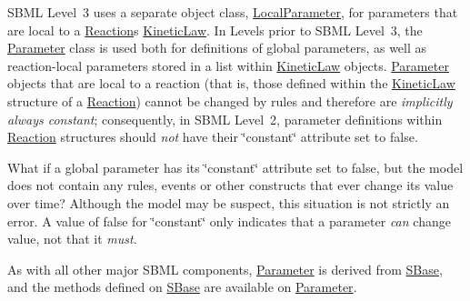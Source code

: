 S\+B\+ML Level~3 uses a separate object class, \hyperlink{class_local_parameter}{Local\+Parameter}, for parameters that are local to a \hyperlink{class_reaction}{Reaction}\textquotesingle{}s \hyperlink{class_kinetic_law}{Kinetic\+Law}. In Levels prior to S\+B\+ML Level~3, the \hyperlink{class_parameter}{Parameter} class is used both for definitions of global parameters, as well as reaction-\/local parameters stored in a list within \hyperlink{class_kinetic_law}{Kinetic\+Law} objects. \hyperlink{class_parameter}{Parameter} objects that are local to a reaction (that is, those defined within the \hyperlink{class_kinetic_law}{Kinetic\+Law} structure of a \hyperlink{class_reaction}{Reaction}) cannot be changed by rules and therefore are {\itshape implicitly always constant}; consequently, in S\+B\+ML Level~2, parameter definitions within \hyperlink{class_reaction}{Reaction} structures should {\itshape not} have their \char`\"{}constant\char`\"{} attribute set to {\ttfamily false}.

What if a global parameter has its \char`\"{}constant\char`\"{} attribute set to {\ttfamily false}, but the model does not contain any rules, events or other constructs that ever change its value over time? Although the model may be suspect, this situation is not strictly an error. A value of {\ttfamily false} for \char`\"{}constant\char`\"{} only indicates that a parameter {\itshape can} change value, not that it {\itshape must}.

As with all other major S\+B\+ML components, \hyperlink{class_parameter}{Parameter} is derived from \hyperlink{class_s_base}{S\+Base}, and the methods defined on \hyperlink{class_s_base}{S\+Base} are available on \hyperlink{class_parameter}{Parameter}.

